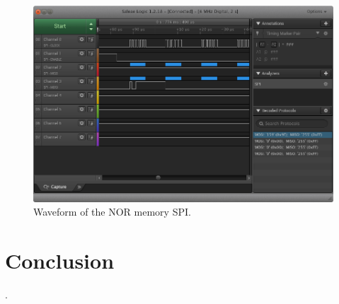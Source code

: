 \begin{figure}[!ht]
    \begin{center}
        \includegraphics[width=\columnwidth]{figures/v05/waveform-spi-mem.png}
        \caption{Waveform of the NOR memory SPI.}
        \label{fig:waveform-spi-mem}
    \end{center}
\end{figure}

\section{Conclusion}

.
